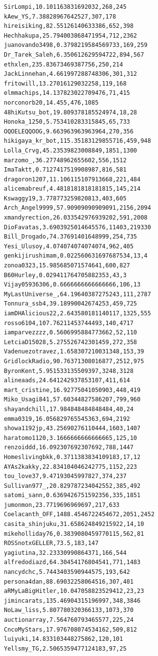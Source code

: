 \begin{verbatim}
SirLompi,10.101163831692032,268,245
kAew_YS,7.38828967642527,307,178
hireisiking,82.55126140633386,652,398
Hechhakupa,25.794003868471954,712,2362
juanovando3498,0.3798219584569733,169,259
Dr_Tarek_Saleh,6.350612629594722,894,567
ethxlen,235.83673469387756,250,214
JackLinnehan,4.661997288748306,301,312
fritowill,13.27016129032258,119,168
elmmachips,14.137823022709476,71,415
norconorb20,14.455,476,1085
48hiKutsu_bot,19.809378185524974,18,28
Honoka_1250,5.753410283315845,65,733
OQOELEQQOOG,9.663963963963964,270,356
hikigaya_kr_bot,115.35183129855716,459,948
Lolla_Crvg,45.23539823008849,1851,1300
marzomo_,36.27748962655602,556,1512
ImaTaktt,0.7127417519908987,816,581
dragoron1207,11.106115107913668,221,484
alicemabreuf,4.4818181818181815,145,214
Kswaggy19,3.778773259820813,403,605
Arch_Angel9999,57.90909090909091,2156,2094
xmandyrection,26.033542976939202,591,2008
DioFavatas,3.6903925014645576,11403,219330
Bill_Drogado,74.37691401648999,254,735
Yesi_Ulusoy,4.074074074074074,962,405
genkijirushimam,0.022560631697687534,13,4
zonoa0323,15.985685071574641,600,827
B60Hurley,0.029411764705882353,43,3
Vijay05936306,0.6666666666666666,106,13
MyLastUniverse_,64.19640387275243,111,2787
Tonnura_ssb4,39.18990042674253,459,725
iamDHAlicious22,2.643580181140117,1325,555
rosso6104,107.76211453744493,140,4717
iamparvezzzz,0.5606995884773662,52,110
LetciaD15028,5.275526742301459,272,358
Vadenuezotravez,1.658307210031348,153,39
GridlockRadio,90.76371308016877,2512,975
ByronKent,5.951533135509397,3248,3128
alineaads,24.641242937853107,411,614
mart_cristine,16.92775041050903,448,419
Miko_Usagi841,57.60344827586207,799,960
shayandchill,17.984848484848484,40,24
emma0319,16.056829765545363,694,2192
showa1192jp,43.25690276110444,1603,1407
haratomo1120,3.1666666666666665,125,10
renzoiddd,16.092307692307692,788,1447
Homeslivingbkk,0.3711383834109183,17,12
AYAs2kakky,22.834104046242775,1152,223
tou_love37,9.47193045997827,374,237
Sullivan977_,20.829787234042552,385,492
satomi_sann,0.6369426751592356,335,1851
jumonmon,23.7719696969697,217,633
Coelacanth_OFF,1488.4546722454672,2051,2452
casita_shinjuku,31.658624849215922,14,10
mikeholliday76,0.3839080459770115,562,81
ROSSnotxGELLER,73.5,183,147
yagiutina,32.23330990864371,166,544
alfredodiazd,64.30454176804541,771,1483
nancydchc,5.7443403590944575,193,642
persona4dan,88.69032258064516,307,401
aRMyLaBigHitler,10.047058823529412,23,23
jimincarats,135.46904315196997,348,3846
NoLaw_liss,5.807780320366133,1073,370
auctionarray,7.564760793465577,225,24
CncoMyStars,17.976708074534162,509,812
luiyuki,14.833103448275862,120,101
Yellsmy_TG,2.5065359477124183,97,25


\end{verbatim}
\newpage

